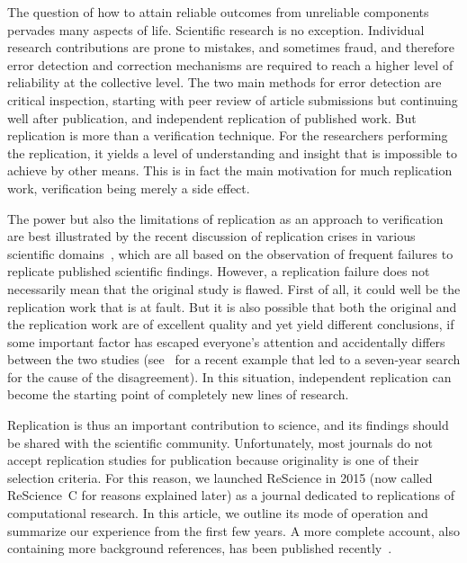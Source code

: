 \documentclass[runningheads]{llncs}
\begin{document}
The question of how to attain reliable outcomes from unreliable components pervades many aspects of life. Scientific research is no exception. Individual research contributions are prone to mistakes, and sometimes fraud, and therefore error detection and correction mechanisms are required to reach a higher level of reliability at the collective level. The two main methods for error detection are critical inspection, starting with peer review of article submissions but continuing well after publication, and independent replication of published work. But replication is more than a verification technique. For the researchers performing the replication, it yields a level of understanding and insight that is impossible to achieve by other means. This is in fact the main motivation for much replication work, verification being merely a side effect.

The power but also the limitations of replication as an approach to verification are best illustrated by the recent discussion of replication crises in various scientific domains~\cite{IoannidisWhyMostPublished2005,Baker500scientistslift2016,Munafomanifestoreproduciblescience2017,IqbalReproducibleResearchPractices2016}, which are all based on the observation of frequent failures to replicate published scientific findings. However, a replication failure does not necessarily mean that the original study is flawed. First of all, it could well be the replication work that is at fault. But it is also possible that both the original and the replication work are of excellent quality and yet yield different conclusions, if some important factor has escaped everyone's attention and accidentally differs between the two studies (see~\cite{Smartwarsupercooledwater2018,PalmerCommentputativeliquidliquid2018} for a recent example that led to a seven-year search for the cause of the disagreement). In this situation, independent replication can become the starting point of completely new lines of research.

Replication is thus an important contribution to science, and its findings should be shared with the scientific community. Unfortunately, most journals do not accept replication studies for publication because originality is one of their selection criteria. For this reason, we launched ReScience in 2015 (now called ReScience~C for reasons explained later) as a journal dedicated to replications of computational research. In this article, we outline its mode of operation and summarize our experience from the first few years. A more complete account, also containing more background references, has been published recently~\cite{RougierSustainablecomputationalscience2017}.
\end{document}
